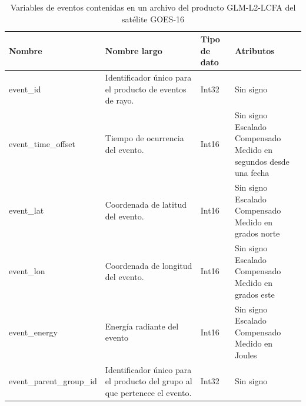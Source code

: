 \begin{table}[H]
  \centering
  \small
  \label{tab:vars_events_glm}
  \caption{
    Variables de eventos contenidas en un archivo del producto GLM-L2-LCFA del 
    satélite GOES-16
  }
  \begin{tabular}{l|p{3cm}|p{1.15cm}|p{3.5cm}}
    \textbf{Nombre} & 
    \textbf{Nombre largo} & 
    \textbf{Tipo de dato} & 
    \textbf{Atributos} \\ \hline

    event\_id & 
    Identificador único para el producto de eventos de rayo. &
    Int32 &
    {Sin signo}\\ \hline

    event\_time\_offset &
    Tiempo de ocurrencia del evento. &
    Int16 &
    \parbox[t]{3.5cm}{Sin signo \\ Escalado \\ Compensado \\ Medido en segundos desde una fecha}\\ \hline
    
    event\_lat &
    Coordenada de latitud del evento. &
    Int16 &
    \parbox[t]{3.5cm}{Sin signo \\ Escalado \\ Compensado \\ Medido en grados norte}\\ \hline

    event\_lon &
    Coordenada de longitud del evento. &
    Int16 &
    \parbox[t]{3.5cm}{Sin signo \\ Escalado \\ Compensado \\ Medido en grados este}\\ \hline

    event\_energy &
    Energía radiante del evento &
    Int16 &
    \parbox[t]{3.5cm}{Sin signo \\ Escalado \\ Compensado \\ Medido en Joules}\\ \hline

    event\_parent\_group\_id &
    Identificador único para el producto del grupo al que pertenece el evento. &
    Int32 &
    \parbox[t]{3.5cm}{Sin signo}\\
  \end{tabular}
\end{table}

